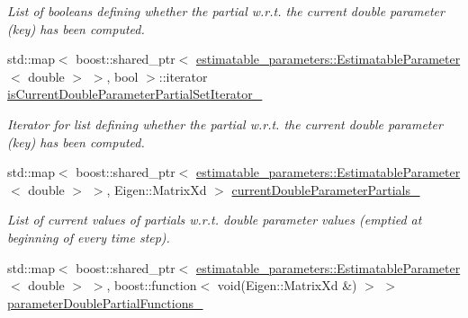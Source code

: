 \begin{DoxyCompactItemize}
\begin{DoxyCompactList}\small\item\em List of booleans defining whether the partial w.\+r.\+t. the current double parameter (key) has been computed. \end{DoxyCompactList}\item 
std\+::map$<$ boost\+::shared\+\_\+ptr$<$ \hyperlink{classtudat_1_1estimatable__parameters_1_1EstimatableParameter}{estimatable\+\_\+parameters\+::\+Estimatable\+Parameter}$<$ double $>$ $>$, bool $>$\+::iterator \hyperlink{classtudat_1_1orbit__determination_1_1StateDerivativePartial_a4d27fe9188cbfafb635b0cf75593a936}{is\+Current\+Double\+Parameter\+Partial\+Set\+Iterator\+\_\+}\hypertarget{classtudat_1_1orbit__determination_1_1StateDerivativePartial_a4d27fe9188cbfafb635b0cf75593a936}{}\label{classtudat_1_1orbit__determination_1_1StateDerivativePartial_a4d27fe9188cbfafb635b0cf75593a936}

\begin{DoxyCompactList}\small\item\em Iterator for list defining whether the partial w.\+r.\+t. the current double parameter (key) has been computed. \end{DoxyCompactList}\item 
std\+::map$<$ boost\+::shared\+\_\+ptr$<$ \hyperlink{classtudat_1_1estimatable__parameters_1_1EstimatableParameter}{estimatable\+\_\+parameters\+::\+Estimatable\+Parameter}$<$ double $>$ $>$, Eigen\+::\+Matrix\+Xd $>$ \hyperlink{classtudat_1_1orbit__determination_1_1StateDerivativePartial_a289e4f51d659e766337b81928d3c6008}{current\+Double\+Parameter\+Partials\+\_\+}\hypertarget{classtudat_1_1orbit__determination_1_1StateDerivativePartial_a289e4f51d659e766337b81928d3c6008}{}\label{classtudat_1_1orbit__determination_1_1StateDerivativePartial_a289e4f51d659e766337b81928d3c6008}

\begin{DoxyCompactList}\small\item\em List of current values of partials w.\+r.\+t. double parameter values (emptied at beginning of every time step). \end{DoxyCompactList}\item 
std\+::map$<$ boost\+::shared\+\_\+ptr$<$ \hyperlink{classtudat_1_1estimatable__parameters_1_1EstimatableParameter}{estimatable\+\_\+parameters\+::\+Estimatable\+Parameter}$<$ double $>$ $>$, boost\+::function$<$ void(Eigen\+::\+Matrix\+Xd \&) $>$ $>$ \hyperlink{classtudat_1_1orbit__determination_1_1StateDerivativePartial_aebbb22ccfcdbc13b8c7859225551f780}{parameter\+Double\+Partial\+Functions\+\_\+}\hypertarget{classtudat_1_1orbit__determination_1_1StateDerivativePartial_aebbb22ccfcdbc13b8c7859225551f780}{}\label{classtudat_1_1orbit__determination_1_1StateDerivativePartial_aebbb22ccfcdbc13b8c7859225551f780}


\end{DoxyCompactItemize}

